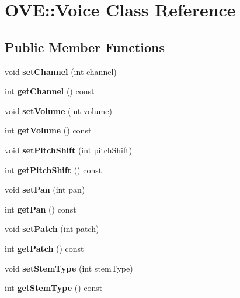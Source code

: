\hypertarget{class_o_v_e_1_1_voice}{}\section{O\+VE\+:\+:Voice Class Reference}
\label{class_o_v_e_1_1_voice}
\subsection*{Public Member Functions}
\begin{DoxyCompactItemize}
\item 
\mbox{\label{class_o_v_e_1_1_voice_a89bcbfca72a2c4ec477b87c5bebb7e98}} 
void {\bfseries set\+Channel} (int channel)
\item 
\mbox{\label{class_o_v_e_1_1_voice_a1fa2311656c57b2461e5b098f039b104}} 
int {\bfseries get\+Channel} () const
\item 
\mbox{\label{class_o_v_e_1_1_voice_afd432db870e6b62caf3a81f11bb97fe0}} 
void {\bfseries set\+Volume} (int volume)
\item 
\mbox{\label{class_o_v_e_1_1_voice_a8697265749b6bdd4bcbad559b81566dd}} 
int {\bfseries get\+Volume} () const
\item 
\mbox{\label{class_o_v_e_1_1_voice_a17fb8b65e09528a0ddfb00ac1164f6ac}} 
void {\bfseries set\+Pitch\+Shift} (int pitch\+Shift)
\item 
\mbox{\label{class_o_v_e_1_1_voice_a08e4781447b9bed2ba4bfa71817ca74a}} 
int {\bfseries get\+Pitch\+Shift} () const
\item 
\mbox{\label{class_o_v_e_1_1_voice_aa71575f7c4b27b17335e70150c357687}} 
void {\bfseries set\+Pan} (int pan)
\item 
\mbox{\label{class_o_v_e_1_1_voice_a116622e35be0918e48ef7b0a3a4448fa}} 
int {\bfseries get\+Pan} () const
\item 
\mbox{\label{class_o_v_e_1_1_voice_a404da5e627dd00b647fd96676c30f7ab}} 
void {\bfseries set\+Patch} (int patch)
\item 
\mbox{\label{class_o_v_e_1_1_voice_a8a1f185e2031a976e2ae9befe649305a}} 
int {\bfseries get\+Patch} () const
\item 
\mbox{\label{class_o_v_e_1_1_voice_a5b168de91c1e615e8ade9b8bed265605}} 
void {\bfseries set\+Stem\+Type} (int stem\+Type)
\item 
\mbox{\label{class_o_v_e_1_1_voice_a4a23c90cd179705d5c761041d6ebe33c}} 
int {\bfseries get\+Stem\+Type} () const
\end{DoxyCompactItemize}
